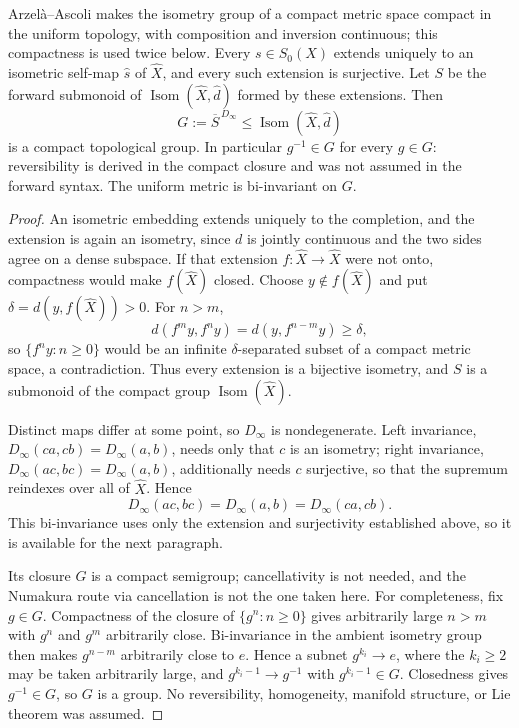 \documentclass[12pt,a4paper]{article}
\begin{document}
\begin{theorem}
\label{p2:thm:gp1-bounded-isometry-closure}
Arzel\`a--Ascoli makes the isometry group of a compact metric space compact in
the uniform topology, with composition and inversion continuous; this
compactness is used twice below.  Every \(s\in S_0(X)\) extends uniquely to an
isometric self-map
\(\widehat s\) of \(\widehat X\), and every such extension is surjective.
Let \(S\) be the forward submonoid of
\(\operatorname{Isom}(\widehat X,\widehat d)\) formed by these extensions.
Then
\[
 G:=\overline S^{\,D_\infty}
 \leq\operatorname{Isom}(\widehat X,\widehat d)
\]
is a compact topological group.  In particular \(g^{-1}\in G\) for every
\(g\in G\): reversibility is derived in the compact closure and was not
assumed in the forward syntax.  The uniform metric is bi-invariant on \(G\).
\end{theorem}

\begin{proof}
An isometric embedding extends uniquely to the completion, and the extension
is again an isometry, since \(d\) is jointly continuous and the two sides
agree on a dense subspace.  If that extension
\(f:\widehat X\to\widehat X\) were not onto, compactness would make
\(f(\widehat X)\) closed.  Choose \(y\notin f(\widehat X)\) and put
\(\delta=d(y,f(\widehat X))>0\).  For \(n>m\),
\[
 d(f^my,f^ny)=d(y,f^{n-m}y)\ge\delta,
\]
so \(\{f^ny:n\ge0\}\) would be an infinite \(\delta\)-separated subset of a
compact metric space, a contradiction.  Thus every extension is a bijective
isometry, and \(S\) is a submonoid of the compact group
\(\operatorname{Isom}(\widehat X)\).

Distinct maps differ at some point, so \(D_\infty\) is nondegenerate.  Left
invariance,
\(D_\infty(ca,cb)=D_\infty(a,b)\), needs only that \(c\) is an isometry;
right invariance,
\(D_\infty(ac,bc)=D_\infty(a,b)\), additionally needs \(c\) surjective, so
that the supremum reindexes over all of \(\widehat X\).  Hence
\[
 D_\infty(ac,bc)=D_\infty(a,b)
 =D_\infty(ca,cb).
\]
This bi-invariance uses only the extension and surjectivity established above,
so it is available for the next paragraph.

Its closure \(G\) is a compact semigroup; cancellativity is not needed, and
the Numakura route via cancellation is not the one taken here.  For completeness, fix
\(g\in G\).  Compactness of the closure of \(\{g^n:n\ge0\}\) gives arbitrarily
large \(n>m\) with \(g^n\) and \(g^m\) arbitrarily close.  Bi-invariance in the
ambient isometry group then makes \(g^{n-m}\) arbitrarily close to \(e\).
Hence a subnet \(g^{k_i}\to e\), where the \(k_i\ge2\) may be taken
arbitrarily large, and \(g^{k_i-1}\to g^{-1}\) with
\(g^{k_i-1}\in G\).  Closedness gives \(g^{-1}\in G\), so \(G\) is a
group.
No reversibility,
homogeneity, manifold structure, or Lie theorem was assumed.
\end{proof}
\end{document}
